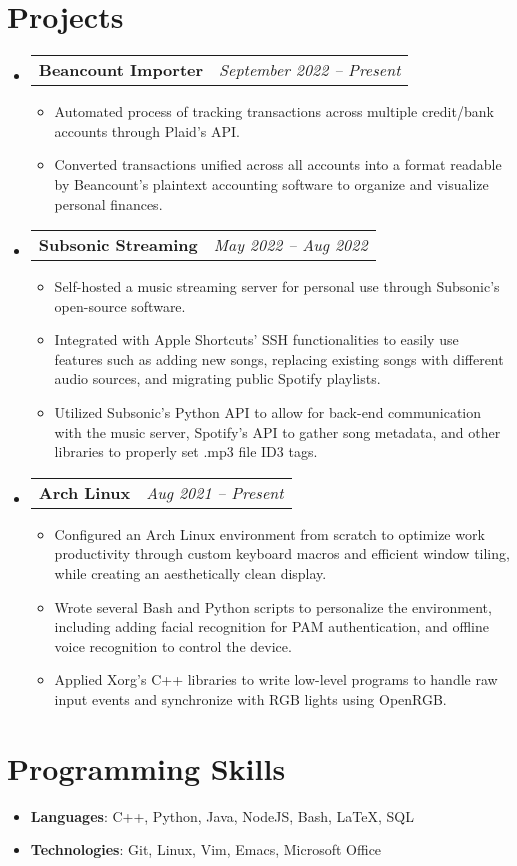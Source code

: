 \documentclass[letterpaper,11pt]{article}
\makeatletter
\newcommand{\resumeItemSkills}[2]{
  \item\normalsize{
    \textbf{#1}{: #2 \vspace{-2pt}}
  }
}
\newcommand{\resumeItemExperience}[1]{
  \item\small{
    {#1 \vspace{-2pt}}
  }
}
\newcommand{\resumeSubheadingProject}[2]{
  \vspace{-1pt}\item
    \begin{tabular*}{0.97\textwidth}{l@{\extracolsep{\fill}}r}
      \textbf{#1} & \textit{\small #2} \\
    \end{tabular*}\vspace{-5pt}
}
\newcommand{\resumeSubItemSkills}[2]{\resumeItemSkills{#1}{#2}\vspace{-4pt}}
\newcommand{\resumeSubHeadingListStart}{\begin{itemize}[leftmargin=*, label={}]}
\newcommand{\resumeSubHeadingListStartSkillsAwards}{\begin{itemize}[leftmargin=*]}
\newcommand{\resumeSubHeadingListEnd}{\end{itemize}}
\newcommand{\resumeItemListStart}{\begin{itemize}}
\newcommand{\resumeItemListEnd}{\end{itemize}\vspace{-5pt}}
\makeatother
\begin{document}
\section{Projects}
  \resumeSubHeadingListStart
        \resumeSubheadingProject
          {Beancount Importer}{September 2022 -- Present}
          \resumeItemListStart
            \resumeItemExperience
              {Automated process of tracking transactions across multiple credit/bank accounts through Plaid's API.}
            \resumeItemExperience
              {Converted transactions unified across all accounts into a format readable by Beancount's plaintext accounting software to organize and visualize personal finances.}
          \resumeItemListEnd
        \resumeSubheadingProject
          {Subsonic Streaming}{May 2022 -- Aug 2022}
          \resumeItemListStart
            \resumeItemExperience
              {Self-hosted a music streaming server for personal use through Subsonic's open-source software.}
            \resumeItemExperience
              {Integrated with Apple Shortcuts' SSH functionalities to easily use features such as adding new songs, replacing existing songs with different audio sources, and migrating public Spotify playlists.}
            \resumeItemExperience
              {Utilized Subsonic's Python API to allow for back-end communication with the music server, Spotify's API to gather song metadata, and other libraries to properly set .mp3 file ID3 tags.}
          \resumeItemListEnd
        \resumeSubheadingProject
          {Arch Linux}{Aug 2021 -- Present}
          \resumeItemListStart
            \resumeItemExperience
              {Configured an Arch Linux environment from scratch to optimize work productivity through custom keyboard macros and efficient window tiling, while creating an aesthetically clean display.}
            \resumeItemExperience
              {Wrote several Bash and Python scripts to personalize the environment, including adding facial recognition for PAM authentication, and offline voice recognition to control the device.}
            \resumeItemExperience
              {Applied Xorg's C++ libraries to write low-level programs to handle raw input events and synchronize with RGB lights using OpenRGB.}
          \resumeItemListEnd
    \resumeSubHeadingListEnd
          
\section{Programming Skills}
 \resumeSubHeadingListStartSkillsAwards
   \resumeSubItemSkills{Languages}{C++, Python, Java, NodeJS, Bash, LaTeX, SQL}
    \resumeSubItemSkills{Technologies}{Git, Linux, Vim, Emacs, Microsoft Office}
 \resumeSubHeadingListEnd
\end{document}

